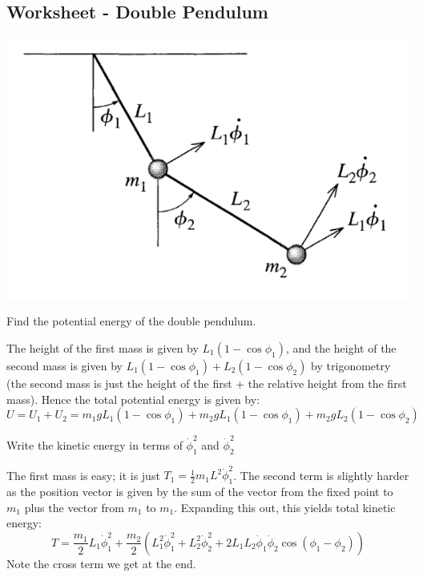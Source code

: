 \subsection{Worksheet - Double Pendulum}
\begin{center}
    \includegraphics[scale=0.5]{Lecture-11/w11-img1.png}
\end{center}
\begin{p}
Find the potential energy of the double pendulum.
\end{p}
\begin{s}
The height of the first mass is given by $L_1(1-\cos\phi_1)$, and the height of the second mass is given by $L_1(1-\cos\phi_1) + L_2(1-\cos\phi_2)$ by trigonometry (the second mass is just the height of the first + the relative height from the first mass). Hence the total potential energy is given by:
\[U = U_1 + U_2 = m_1gL_1(1-\cos\phi_1) + m_2gL_1(1-\cos\phi_1) + m_2gL_2(1-\cos\phi_2)\]
\end{s}

\begin{p}
Write the kinetic energy in terms of $\dot{\phi}^2_1$ and $\dot{\phi}^2_2$
\end{p}
\begin{s}
The first mass is easy; it is just $T_1 = \frac{1}{2}m_1L^2\dot{\phi}_1^2$. The second term is slightly harder as the position vector is given by the sum of the vector from the fixed point to $m_1$ plus the vector from $m_1$ to $m_1$. Expanding this out, this yields total kinetic energy:
\[T = \frac{m_1}{2}L_1\dot{\phi}_1^2 + \frac{m_2}{2}\left(L_1^2\dot{\phi}_1^2 + L_2^2\dot{\phi}_2^2 + 2L_1L_2\dot{\phi}_1\dot{\phi}_2\cos(\phi_1 - \phi_2)\right)\]
Note the cross term we get at the end.
\end{s}


